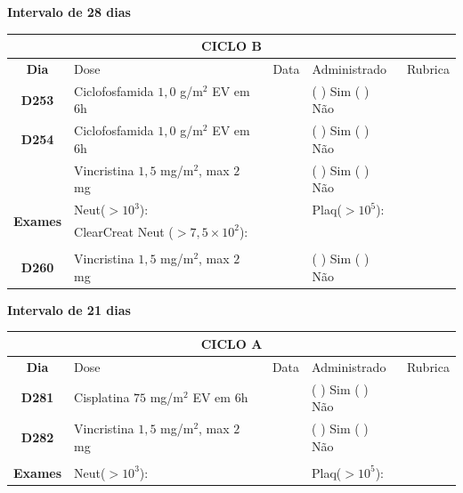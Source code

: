 \documentclass[11pt,a4paper,oldfontcommands]{memoir}
\begin{document}
\begin{center}
    \textbf{Intervalo de 28 dias}
    \begin{table}[H]
    \begin{tabular}{p{1cm}p{6cm}|p{1cm}|p{3cm}|p{2.5cm}}
    \hline
	\multicolumn{5}{c}{\textbf{CICLO B}}\\
	\hline
    \multicolumn{1}{c|}{\multirow{1}{*}{\textbf{Dia}}}&{Dose}&{Data}&{Administrado}&{Rubrica} \\
    \hline
    \multicolumn{1}{c|}{\multirow{1}{*}{\textbf{D253}}}&{Ciclofosfamida \(1,0\) g/m\(^2\) EV em 6h}&&{(  ) Sim (  ) Não}&\\
    \multicolumn{1}{c|}{\multirow{1}{*}{\textbf{D254}}}&{Ciclofosfamida \(1,0\) g/m\(^2\) EV em 6h}&&{(  ) Sim (  ) Não}&\\
    \multicolumn{1}{c|}{\multirow{1}{*}{\textbf{}}}&{Vincristina \(1,5\) mg/m\(^2\), max \(2\) mg}&&{(  ) Sim (  ) Não}&\\
    \hline
    \multicolumn{1}{c|}{\multirow{2}{*}{\textbf{Exames}}}&\multicolumn{2}{l|}{Neut(\(>10^3\)):}&{Plaq(\(>10^5\)):}&\\
    \cline{2-5}
    \multicolumn{1}{c|}{\multirow{2}{*}{{}}}&\multicolumn{2}{l|}{ClearCreat Neut (\(>7,5\times10^2\)):}&{}&{}\\
    \hline
    \\
    \hline
    \multicolumn{1}{c|}{\multirow{1}{*}{\textbf{D260}}}&{Vincristina \(1,5\) mg/m\(^2\), max \(2\) mg}&&{(  ) Sim (  ) Não}&\\
    \hline
\end{tabular}
\end{table}
\textbf{Intervalo de 21 dias}
\begin{table}[H]
\begin{tabular}{p{1cm}p{6cm}|p{1cm}|p{3cm}|p{2.5cm}}
	\hline
	\multicolumn{5}{c}{\textbf{CICLO A}}\\
\hline
    \multicolumn{1}{c|}{\multirow{1}{*}{\textbf{Dia}}}&{Dose}&{Data}&{Administrado}&{Rubrica} \\
    \hline
    \multicolumn{1}{c|}{\multirow{1}{*}{\textbf{D281}}}&{Cisplatina \(75\) mg/m\(^2\) EV em 6h}&&{(  ) Sim (  ) Não}&\\
    \multicolumn{1}{c|}{\multirow{1}{*}{\textbf{D282}}}&{Vincristina \(1,5\) mg/m\(^2\), max \(2\) mg}&&{(  ) Sim (  ) Não}&\\
    \multicolumn{1}{c|}{\multirow{1}{*}{\textbf{}}}&&&&\\
    \hline
    \multicolumn{1}{c|}{\multirow{2}{*}{\textbf{Exames}}}&\multicolumn{2}{l|}{Neut(\(>10^3\)):}&{Plaq(\(>10^5\)):}&\\

\end{tabular}
\end{table}
\end{center}
\end{document}
